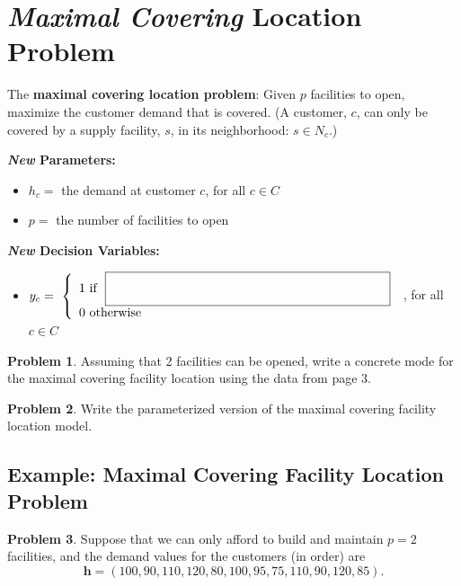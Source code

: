 \documentclass[11pt]{article}
\theoremstyle{definition}
\newtheorem{problem}{Problem}
\newcommand{\answerbox}[3]{%
  \fbox{%
    \begin{minipage}[#1]{#2}
      \hfill\vspace{#3}
    \end{minipage}
  }
}
\begin{document}
\newpage
\section{\emph{Maximal Covering} Location Problem}
The \textbf{maximal covering location problem}: Given $p$ facilities to open, maximize the customer demand that is covered.  (A customer, $c$, can only be covered by a supply facility, $s$, in its neighborhood: $s \in N_c$.)

\begin{center}
\end{center}

\textbf{
\emph{New} Parameters: }
\begin{itemize}
\item[] $h_c = $ the demand at customer $c$, for all $c \in C$
\item[]  $p = $ the number of facilities to open
\end{itemize}
\textbf{\emph{New} Decision Variables: }
\begin{itemize}
\item[] \def\arraystretch{1.8} $y_c = ~\left\{ \begin{array}{ll} 1 \text{ if }~\answerbox{c}{3in}{.7cm} \\ 0 \text{ otherwise } \end{array} \right. $
, for all $c \in C$
\end{itemize}

\begin{problem}
Assuming that 2 facilities can be opened, write a concrete mode for the maximal covering facility location using the data from page 3.
\end{problem}

\newpage

\begin{problem}
Write the parameterized version of the maximal covering facility location model.
\end{problem}


\newpage
\subsection{Example:  Maximal Covering Facility Location Problem}

\begin{problem}
Suppose that we can only afford to build and maintain $p = 2$ facilities, and the demand values for the customers (in order) are 
\[
\textbf{h} = (100, 90, 110, 120, 80, 100, 95, 75, 110, 90, 120, 85).
\]
\end{problem}
\end{document}
